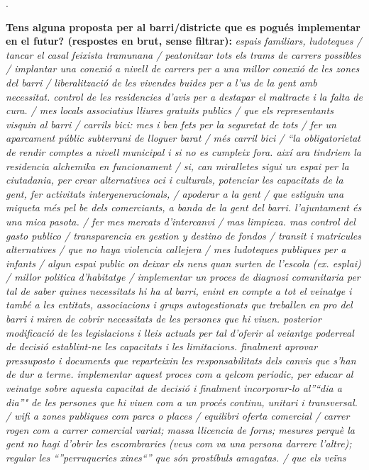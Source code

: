 \documentclass[]{article}
\begin{document}
.

\textbf{Tens alguna proposta per al barri/districte que es pogués
implementar en el futur? (respostes en brut, sense filtrar):}
\emph{espais familiars, ludoteques / tancar el casal feixista tramunana
/ peatonitzar tots els trams de carrers possibles / implantar una
conexió a nivell de carrers per a una millor conexió de les zones del
barri / liberalització de les vivendes buides per a l'us de la gent amb
necessitat. control de les residencies d'avis per a destapar el
maltracte i la falta de cura. / mes locals associatius lliures gratuits
publics / que els representants visquin al barri / carrils bici: mes i
ben fets per la seguretat de tots / fer un aparcament públic subterrani
de lloguer barat / més carril bici / ``la obligatorietat de rendir
comptes a nivell municipal i si no es cumpleix fora. així ara tindriem
la residencia alchemika en funcionament / si, can miralletes sigui un
espai per la ciutadania, per crear alternatives oci i culturals,
potenciar les capacitats de la gent, fer activitats intergeneracionals,
/ apoderar a la gent / que estiguin una miqueta més pel be dels
comerciants, a banda de la gent del barri. l'ajuntament és una mica
pasota. / fer mes mercats d'intercanvi / mas limpieza. mas control del
gasto publico / transparencia en gestion y destino de fondos / transit i
matricules alternatives / que no haya violencia callejera / mes
ludoteques publiques per a infants / algun espai public on deixar els
nens quan surten de l'escola (ex. esplai) / millor politica d'habitatge
/ implementar un proces de diagnosi comunitaria per tal de saber quines
necessitats hi ha al barri, enint en compte a tot el veinatge i també a
les entitats, associacions i grups autogestionats que treballen en pro
del barri i miren de cobrir necessitats de les persones que hi viuen.
posterior modificació de les legislacions i lleis actuals per tal
d'oferir al veiantge poderreal de decisió establint-ne les capacitats i
les limitacions. finalment aprovar pressuposto i documents que
reparteixin les responsabilitats dels canvis que s'han de dur a terme.
implementar aquest proces com a qelcom periodic, per educar al veinatge
sobre aquesta capacitat de decisió i finalment incorporar-lo al''``dia a
dia''" de les persones que hi viuen com a un procés continu, unitari i
transversal. / wifi a zones publiques com parcs o places / equilibri
oferta comercial / carrer rogen com a carrer comercial variat; massa
llicencia de forns; mesures perquè la gent no hagi d'obrir les
escombraries (veus com va una persona darrere l'altre); regular les
``''perruqueries xines``'' que són prostíbuls amagatas. / que els veïns
}
\end{document}
